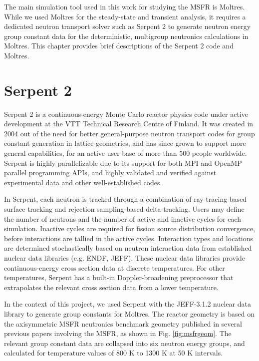 The main simulation tool used in this work for studying the \gls{MSFR} is
Moltres. While we used Moltres for the steady-state and transient analysis, it
requires a dedicated neutron transport solver such as Serpent 2 to generate
neutron energy group constant data for the deterministic, multigroup
neutronics calculations in Moltres. This chapter provides brief descriptions
of the Serpent 2 code and Moltres.

\section{Serpent 2}

Serpent 2 \cite{leppanen_serpent_2014} is a continuous-energy Monte Carlo
reactor physics code under
active development at the VTT Technical Research Centre of Finland. It was
created in 2004 out of the need for better general-purpose neutron transport
codes for group constant generation in lattice geometries, and has since grown
to support more general capabilities, for an active user base of more than 500
people worldwide. Serpent is highly parallelizable due to its support for
both MPI and OpenMP parallel programming APIs, and highly validated and
verified against experimental data and other well-established codes.

In Serpent, each neutron is tracked through a combination of ray-tracing-based
surface tracking and rejection sampling-based delta-tracking. Users may define
the number of neutrons and the number of active and inactive cycles for each
simulation. Inactive cycles are required for fission source distribution
convergence, before interactions are tallied in the active cycles.
Interaction types and locations are
determined stochastically based on neutron interaction data from established
nuclear data libraries (e.g. ENDF, JEFF). These nuclear data libraries provide
continuous-energy cross section data at discrete temperatures. For other
temperatures, Serpent has a built-in Doppler-broadening preprocessor that
extrapolates the relevant cross section data from a lower temperature. 

In the context of this project, we used Serpent with the JEFF-3.1.2 nuclear
data library \cite{oecd/nea_jeff-3.1.2_2014} to generate group constants
for Moltres. The reactor geometry is based on the axisymmetric \gls{MSFR}
neutronics benchmark geometry published in several previous papers involving
the \gls{MSFR}, as shown in Fig. \ref{fig:msfrgeom}. The relevant group
constant data are collapsed into six neutron energy groups, and calculated for
temperature values of 800 K to 1300 K at 50 K intervals.

